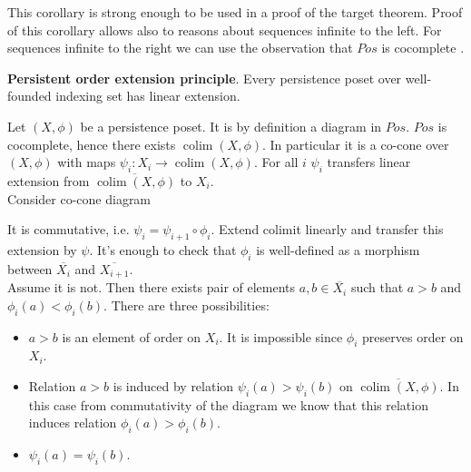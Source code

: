 This corollary is strong enough to be used in a proof of the target theorem. Proof of this corollary allows also to reasons about sequences infinite to the left. For sequences infinite to the right we can use the observation that $Pos$ is cocomplete {\cite[Example 1.10 and Theorem 1.11, page 17]{Adamec94}}.

\begin{proposition}
  \textbf{Persistent order extension principle}. Every persistence poset over well-founded indexing set has linear extension.
\end{proposition}

\begin{pf}
  Let $(X,\phi)$ be a persistence poset. It is by definition a diagram in $Pos$. $Pos$ is cocomplete, hence there exists $\operatorname{colim}(X, \phi)$. In particular it is a co-cone over $(X,\phi)$ with maps $\psi_i : X_i \to \operatorname{colim}(X, \phi)$. For all $i$ $\psi_i$ transfers linear extension from $\overline{\operatorname{colim}(X, \phi)}$ to $X_i$.\\

  Consider co-cone diagram\\
  It is commutative, i.e. $\psi_i = \psi_{i+1} \circ \phi_i$. Extend colimit linearly and transfer this extension by $\psi$. It's enough to check that $\phi_i$ is well-defined as a morphism between $\overline{X_i}$ and $\overline{X_{i+1}}$.\\

  Assume it is not. Then there exists pair of elements $a,b \in \overline{X_i}$ such that $a > b$ and $\phi_i(a) < \phi_i(b)$. There are three possibilities:
  \begin{itemize}
    \item $a > b$ is an element of order on $X_i$. It is impossible since $\phi_i$ preserves order on $X_i$.
    \item Relation $a > b$ is induced by relation $\psi_i(a) > \psi_i(b)$ on $\overline{\operatorname{colim}(X, \phi)}$. In this case from commutativity of the diagram we know that this relation induces relation $\phi_i(a) > \phi_i(b)$.
    \item $\psi_i(a) = \psi_i(b)$.
  \end{itemize}


\end{pf}
